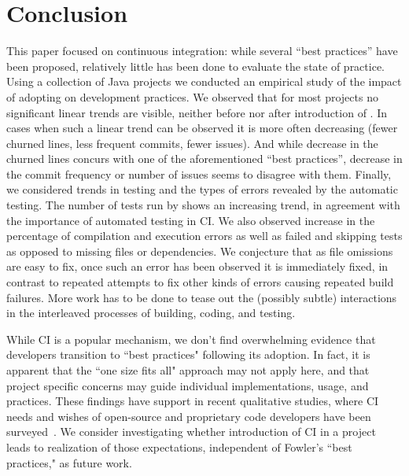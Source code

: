 
\section{Conclusion}
\label{sec:conc}

This paper focused on continuous integration: while several ``best 
practices'' have been proposed, relatively little has been done to evaluate the 
state of practice.
Using a collection of \GH Java projects we conducted an 
empirical study of the impact of adopting \Tvis on development practices.
We observed that for most projects no significant linear trends 
are visible, neither before nor after introduction of \Tvis.
In cases when such a linear trend can be observed it is more often decreasing 
(fewer churned lines, less frequent commits, fewer issues). 
And while decrease in the churned lines concurs with one of the aforementioned 
``best practices'', decrease in the commit frequency or number of issues seems 
to disagree with them. 
Finally, we considered trends in testing and the types of errors revealed 
by the automatic testing.
The number of tests run by \Tvis shows an increasing trend, 
in agreement with the importance of automated testing in CI.
We also observed increase in the percentage of compilation and execution errors 
as well as failed and skipping tests as opposed to missing files or dependencies.
We conjecture that as file omissions are easy to fix, once such an error has been 
observed it is immediately fixed, in contrast to repeated attempts to fix other 
kinds of errors causing repeated build failures.
More work has to be done to tease out the (possibly subtle) interactions in the 
interleaved processes of building, coding, and testing.

While CI is a popular mechanism, we don't 
find overwhelming evidence that developers transition to ``best practices" 
following its adoption.
In fact, it is apparent that the ``one size fits all" approach may not apply here, 
and that project specific concerns may guide individual implementations, usage, 
and practices.
These findings have support in recent qualitative studies, where CI needs and 
wishes of open-source and proprietary code developers have been surveyed~\cite{Hilton2016, hilton2016continuous}.
We consider investigating whether introduction of CI in a project leads to 
realization of those expectations, independent of Fowler's ``best practices," 
as future work.
